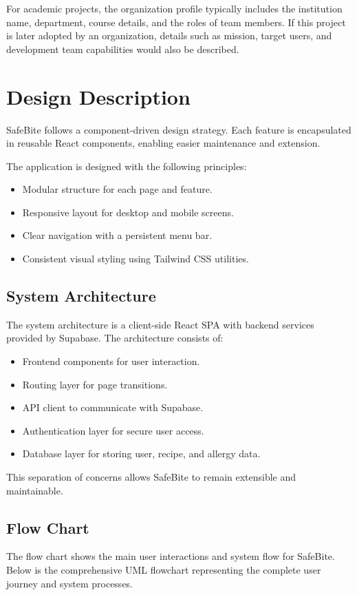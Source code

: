 \documentclass[12pt,a4paper]{report}
\begin{document}
For academic projects, the organization profile typically includes the institution name, department, course details, and the roles of team members. If this project is later adopted by an organization, details such as mission, target users, and development team capabilities would also be described.

\chapter{Design Description}
SafeBite follows a component-driven design strategy. Each feature is encapsulated in reusable React components, enabling easier maintenance and extension.

The application is designed with the following principles:
\begin{itemize}
  \item Modular structure for each page and feature.
  \item Responsive layout for desktop and mobile screens.
  \item Clear navigation with a persistent menu bar.
  \item Consistent visual styling using Tailwind CSS utilities.
\end{itemize}

\section{System Architecture}
The system architecture is a client-side React SPA with backend services provided by Supabase. The architecture consists of:
\begin{itemize}
  \item Frontend components for user interaction.
  \item Routing layer for page transitions.
  \item API client to communicate with Supabase.
  \item Authentication layer for secure user access.
  \item Database layer for storing user, recipe, and allergy data.
\end{itemize}

This separation of concerns allows SafeBite to remain extensible and maintainable.

\section{Flow Chart}
The flow chart shows the main user interactions and system flow for SafeBite. Below is the comprehensive UML flowchart representing the complete user journey and system processes.
\end{document}
